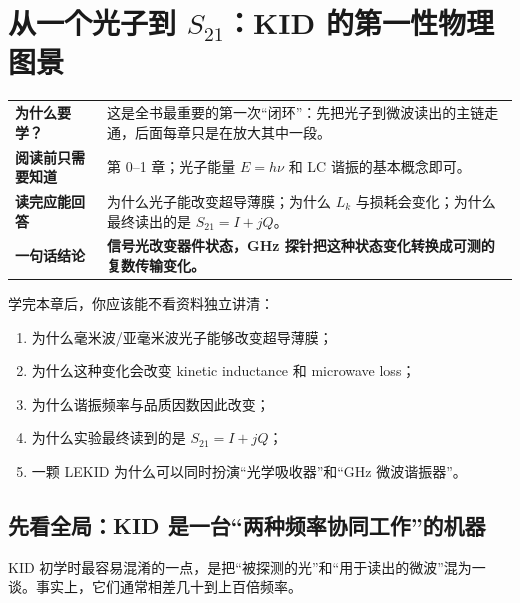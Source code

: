 \documentclass[11pt,a4paper,openany]{ctexrep}
\newcommand{\chapterguide}[4]{%
\begin{tcolorbox}[
  enhanced,
  breakable,
  colback=KidGray!45,
  colframe=KidBlue!65,
  boxrule=0.8pt,
  arc=2mm,
  title=本章导航,
  fonttitle=\bfseries,
  before skip=0.7em,
  after skip=1.0em]
\renewcommand{\arraystretch}{1.18}
\begin{tabularx}{\textwidth}{>{\bfseries\color{KidBlue}}p{3.0cm} X}
为什么要学？ & #1 \\
阅读前只需要知道 & #2 \\
读完应能回答 & #3 \\
一句话结论 & \textbf{#4} \\
\end{tabularx}
\end{tcolorbox}%
}
\newcommand{\Stwentyone}{S_{21}}
\begin{document}
\chapter{从一个光子到 $S_{21}$：KID 的第一性物理图景}
\chapterguide
{这是全书最重要的第一次“闭环”：先把光子到微波读出的主链走通，后面每章只是在放大其中一段。}
{第 0--1 章；光子能量 $E=h\nu$ 和 LC 谐振的基本概念即可。}
{为什么光子能改变超导薄膜；为什么 $L_k$ 与损耗会变化；为什么最终读出的是 $S_{21}=I+jQ$。}
{信号光改变器件状态，GHz 探针把这种状态变化转换成可测的复数传输变化。}

\begin{goalbox}
学完本章后，你应该能不看资料独立讲清：
\begin{enumerate}
  \item 为什么毫米波/亚毫米波光子能够改变超导薄膜；
  \item 为什么这种变化会改变 kinetic inductance 和 microwave loss；
  \item 为什么谐振频率与品质因数因此改变；
  \item 为什么实验最终读到的是 $\Stwentyone=I+jQ$；
  \item 一颗 LEKID 为什么可以同时扮演“光学吸收器”和“GHz 微波谐振器”。
\end{enumerate}
\end{goalbox}

\section{先看全局：KID 是一台“两种频率协同工作”的机器}
KID 初学时最容易混淆的一点，是把“被探测的光”和“用于读出的微波”混为一谈。事实上，它们通常相差几十到上百倍频率。
\end{document}
